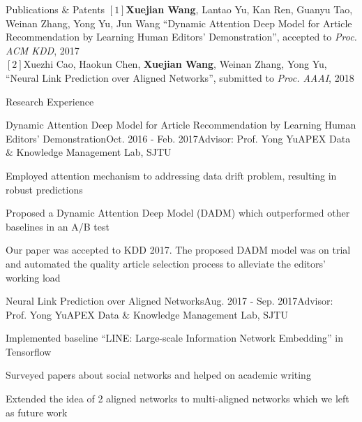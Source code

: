 \documentclass{resume} %
\begin{document}
\begin{rSection}{Publications $\&$ Patents}
$[1]$\textbf{Xuejian Wang}, Lantao Yu, Kan Ren, Guanyu Tao, Weinan Zhang, Yong Yu, Jun Wang ``Dynamic Attention Deep Model for Article Recommendation by Learning Human Editors’ Demonstration'', accepted to  \emph{Proc. ACM KDD}, 2017\\
$[2]$Xuezhi Cao, Haokun Chen, \textbf{Xuejian Wang}, Weinan Zhang, Yong Yu, ``Neural Link Prediction over Aligned Networks'', submitted to  \emph{Proc. AAAI}, 2018\\
\end{rSection}
\begin{rSection}{Research Experience}
\begin{rSubsection}{Dynamic Attention Deep Model for Article Recommendation
by Learning Human Editors’ Demonstration}{Oct. 2016 - Feb. 2017}{Advisor: Prof. Yong Yu}{APEX Data $\&$ Knowledge Management Lab, SJTU}
\item Employed attention mechanism to addressing data drift problem, resulting in robust predictions
\item Proposed a Dynamic Attention Deep Model (DADM) which outperformed other baselines in an A/B test
\item Our paper was accepted to KDD 2017. The proposed DADM model was on trial and automated the quality article selection process to alleviate the editors' working load
\end{rSubsection}
\begin{rSubsection}{Neural Link Prediction over Aligned Networks}{Aug. 2017 - Sep. 2017}{Advisor: Prof. Yong Yu}{APEX Data $\&$ Knowledge Management Lab, SJTU}
\item Implemented baseline ``LINE: Large-scale Information Network Embedding'' in Tensorflow
\item Surveyed papers about social networks and helped on academic writing
\item Extended the idea of 2 aligned networks to multi-aligned networks which we left as future work
\end{rSubsection}

\end{rSection}
\end{document}

